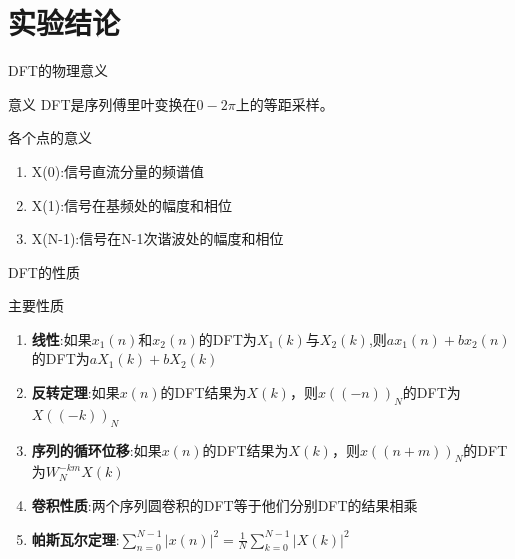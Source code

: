 \documentclass{beamer}
\begin{document}
\section{实验结论}
\begin{frame}{DFT的物理意义}
    \begin{alertblock}{意义}
        DFT是序列傅里叶变换在$0-2\pi$上的等距采样。
    \end{alertblock}
    \hspace*{\fill} 
    \begin{block}{各个点的意义}
        \begin{enumerate}
            \item X(0):信号直流分量的频谱值
            \item X(1):信号在基频处的幅度和相位
            \item X(N-1):信号在N-1次谐波处的幅度和相位
        \end{enumerate}
    \end{block}
    
\end{frame}

\begin{frame}{DFT的性质}
    \begin{block}{主要性质}
        \begin{enumerate}
            \item \textbf{线性}:如果$x_1(n)$和$x_2(n)$的DFT为$X_1(k)$与$X_2(k)$,则$ax_1(n)+bx_2(n)$的DFT为$aX_1(k)+bX_2(k)$
            \item \textbf{反转定理}:如果$x(n)$的DFT结果为$X(k)$，则$x((-n))_N$的DFT为$X((-k))_N$
            \item \textbf{序列的循环位移}:如果$x(n)$的DFT结果为$X(k)$，则$x((n+m))_N$的DFT为$W_N^{-km}X(k)$
            \item \textbf{卷积性质}:两个序列圆卷积的DFT等于他们分别DFT的结果相乘
            \item \textbf{帕斯瓦尔定理}:$\sum_{n=0}^{N-1}|x(n)|^2 = \frac{1}{N}\sum_{k=0}^{N-1}|X(k)|^2$
        \end{enumerate}
    \end{block}
    
\end{frame}
\end{document}
